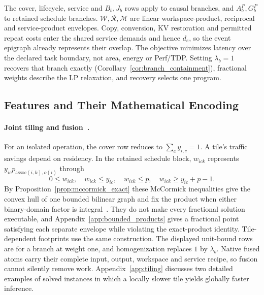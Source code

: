 \begingroup{}
The cover, lifecycle, service and $B_b,J_b$ rows apply to causal branches, and $A_b^P,G_b^P$ to retained schedule branches.
$\mathcal W,\mathcal R,\mathcal M$ are linear workspace-product, reciprocal and service-product envelopes.
Copy, conversion, KV restoration and permitted repeat costs enter the shared service demands and hence $d_e$, so the event epigraph already represents their overlap.
The objective minimizes latency over the declared task boundary, not area, energy or Perf/TDP.
Setting $\lambda_b=1$ recovers that branch exactly (Corollary~\ref{cor:branch_containment}), fractional weights describe the LP relaxation, and recovery selects one program.
\par\endgroup

\subsection{Features and Their Mathematical Encoding}
\label{sec:v3_levers}\label{sec:v0}
\paragraph{Joint tiling and fusion~.}
For an isolated operation, the cover row reduces to $\sum_c y_{i,c}=1$.
A tile's traffic savings depend on residency.
In the retained schedule block, $w_{ick}$ represents $y_{ic}p_{\mathrm{assoc}(i,k),o(i)}$ through
\begin{equation}
0\le w_{ick},\quad w_{ick}\le y_{ic},\quad w_{ick}\le p,\quad
w_{ick}\ge y_{ic}+p-1.
\label{eq:mccormick}
\end{equation}
By Proposition~\ref{prop:mccormick_exact} these McCormick inequalities give the convex hull of one bounded bilinear graph and fix the product when either binary-domain factor is integral~\citep{mccormick1976computability}.
They do not make every fractional solution executable, and Appendix~\ref{app:bounded_products} gives a fractional point satisfying each separate envelope while violating the exact-product identity.
Tile-dependent footprints use the same construction.
The displayed unit-bound rows are for a branch at weight one, and homogenization replaces $1$ by $\lambda_b$.
Native fused atoms carry their complete input, output, workspace and service recipe, so fusion cannot silently remove work.
Appendix~\ref{app:tiling} discusses two detailed examples of solved instances in which a locally slower tile yields globally faster inference.

